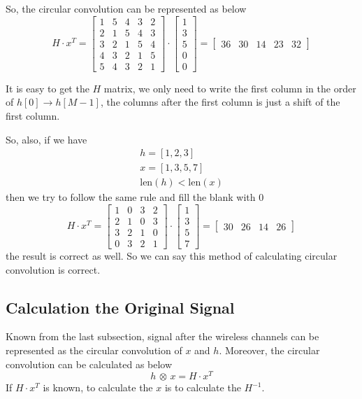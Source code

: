 \documentclass{article}
\begin{document}
So, the circular convolution can be represented as below
$$
H \cdot x^T = 
\begin{bmatrix}
	1 & 5 & 4 & 3 & 2 \\
	2 & 1 & 5 & 4 & 3 \\ 
	3 & 2 & 1 & 5 & 4 \\ 
	4 & 3 & 2 & 1 & 5 \\ 
	5 & 4 & 3 & 2 & 1
\end{bmatrix}
\cdot
\begin{bmatrix}
	1 \\ 
	3 \\ 
	5 \\ 
	0 \\ 
	0 
\end{bmatrix}
= 
\begin{bmatrix}
	36 & 30 & 14 & 23 & 32
\end{bmatrix}
$$

It is easy to get the $H$ matrix, we only need to write the first column in the order of $h[0] \to h[M - 1] $, the columns after the first column is just a shift of the first column.

So, also, if we have
\begin{gather*}
	h = [1, 2, 3] \\ 
	x = [1, 3, 5, 7] \\ 
	\mathrm{len}(h) < \mathrm{len}(x)
\end{gather*}
then we try to follow the same rule and fill the blank with $0$
$$
H \cdot x^T =
\begin{bmatrix}
	1 & 0 & 3 & 2 \\ 
	2 & 1 & 0 & 3 \\ 
	3 & 2 & 1 & 0 \\ 
	0 & 3 & 2 & 1
\end{bmatrix}
\cdot 
\begin{bmatrix}
	1 \\ 
	3 \\ 
	5 \\ 
	7
\end{bmatrix}
=
\begin{bmatrix}
	30 & 26 & 14 & 26
\end{bmatrix}
$$
the result is correct as well. So we can say this method of calculating circular convolution is correct.

\subsection{Calculation the Original Signal}
Known from the last subsection, signal after the wireless channels can be represented as the circular convolution of $x$ and $h$. Moreover, the circular convolution can be calculated as below
$$
h \, \otimes \, x = H \cdot x^T
$$
If $H \cdot x^T$ is known, to calculate the $x$ is to calculate the $H^{-1}$.
\end{document}
